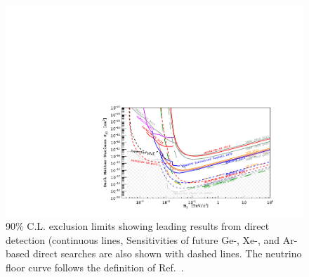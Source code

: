 \documentclass[../report.tex]{subfiles}
\begin{document}
\begin{figure}[t]
\centering
  \includegraphics[width=0.78\linewidth,angle=0,origin=c]{Darkmatter/section1/img/CombinedExclusionLimits_nufloor_2.pdf}
\caption{90\% C.L. exclusion limits showing leading results from direct detection (continuous lines, %
Sensitivities of future Ge-, Xe-, and Ar-based direct searches are also shown with dashed lines. %
The neutrino floor curve follows the definition of Ref.~\cite{Billard:2014cx}. %
}
\label{fig:sensitivity}
\end{figure}
%
%
%
\end{document}
